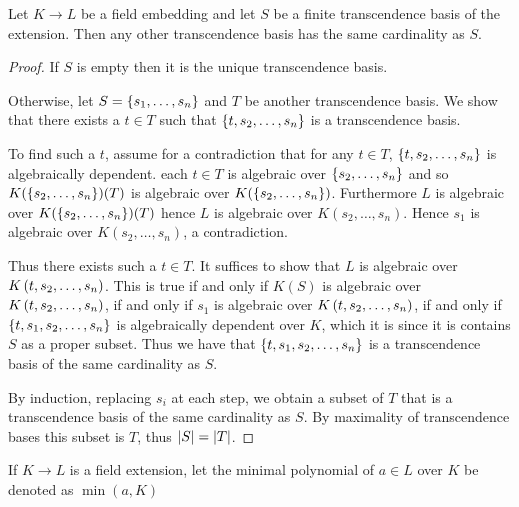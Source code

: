 \begin{prop}
    Let $K \to L$ be a field embedding and let $S$ be a 
    finite transcendence basis of the extension.
    Then any other transcendence basis has the same cardinality as $S$.
\end{prop}
\begin{proof}
    If $S$ is empty then it is the unique transcendence basis.

    Otherwise, 
    let $S = \left\{s_1 , \dots, s_n\right\}$ and $T$ be another transcendence basis.
    We show that there exists a $t \in T$ such that 
    $\left\{t, s_2, \dots, s_n\right\}$ is a transcendence basis.

    To find such a $t$, 
    assume for a contradiction that for any $t \in T$,
    $\left\{t, s_2, \dots, s_n\right\}$ is algebraically dependent.
     each
    $t \in T$ is algebraic over $\left\{s_2, \dots, s_n\right\}$ and
    so $K(\left\{s_2, \dots, s_n\right\})(T)$ is algebraic over 
    $K(\left\{s_2, \dots, s_n\right\})$.
    Furthermore $L$ is algebraic over $K(\left\{s_2, \dots, s_n\right\})(T)$
    hence $L$ is algebraic over $K({s_2, \dots, s_n})$.
    Hence $s_1$ is algebraic over $K(s_2, \dots, s_n)$,
    a contradiction.

    Thus there exists such a $t \in T$.
    It suffices to show that $L$ is algebraic over 
    $K\left(t, s_2, \dots, s_n\right)$. 
    This is true if and only if $K(S)$ is algebraic over 
    $K\left(t, s_2, \dots, s_n\right)$, 
    if and only if $s_1$ is algebraic over
    $K\left(t, s_2, \dots, s_n\right)$,
    if and only if $\left\{t, s_1, s_2, \dots, s_n\right\}$
    is algebraically dependent over $K$,
    which it is since it is contains $S$ as a proper subset.
    Thus we have that $\left\{t, s_1, s_2, \dots, s_n\right\}$ is a transcendence basis
    of the same cardinality as $S$.

    By induction, replacing $s_i$ at each step, 
    we obtain a subset of $T$ that is a transcendence basis of the same
    cardinality as $S$.
    By maximality of transcendence bases this subset is $T$,
    thus $\left\vert S \right\vert = \left\vert T \right\vert$.
\end{proof}

\begin{nttn}
    If $K \to L$ is a field extension, 
    let the minimal polynomial of $a \in L$ over $K$ be denoted as
    $\min(a,K)$
\end{nttn}

